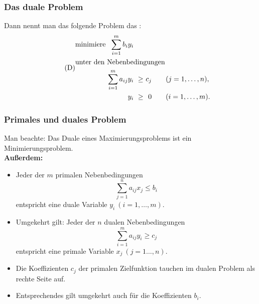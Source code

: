 \documentclass[smaller]{beamer}
\begin{document}
\begin{frame}
\frametitle{Das duale Problem}
 Dann nennt man das folgende Problem das :
\begin{align}
\tag{D}
\begin{alignedat}{4}
& \text{minimiere } & \sum\limits_{i=1}^{m}{b_iy_i} & & & \\
& \rlap{unter den Nebenbedingungen} & & & & \\
&& \sum\limits_{i=1}^{m}{a_{ij}y_i} &\ \geq &\ c_j & \qquad (j=1,\ldots,n), \\
&&                              y_i &\ \geq &\   0 & \qquad (i=1,\ldots,m).
\end{alignedat}
\end{align}
\end{frame}

\begin{frame}
\frametitle{Primales und duales Problem}
 Man beachte: \alert{Das Duale eines Maximierungsproblems ist ein Minimierungsproblem.} \\ \vspace*{0.2cm}
 \textbf{Außerdem:}
 \begin{itemize}
 \item Jeder der $m$ primalen Nebenbedingungen
\[
\sum\limits_{j=1}^{n}{a_{ij}x_j} \leq b_i
\]
entspricht eine duale Variable $y_i\ (i=1,\ldots,m)$. 
\item Umgekehrt gilt: Jeder der $n$ dualen Nebenbedingungen
\[
\sum\limits_{i=1}^{m}{a_{ij}y_i} \geq c_j
\]
entspricht eine primale Variable $x_j\ (j=1\ldots,n)$.
\item Die Koeffizienten $c_j$ der primalen Zielfunktion tauchen im dualen Problem als rechte Seite auf.
\item Entsprechendes gilt umgekehrt auch für die Koeffizienten $b_i$.
\end{itemize}
\end{frame}
\end{document}
